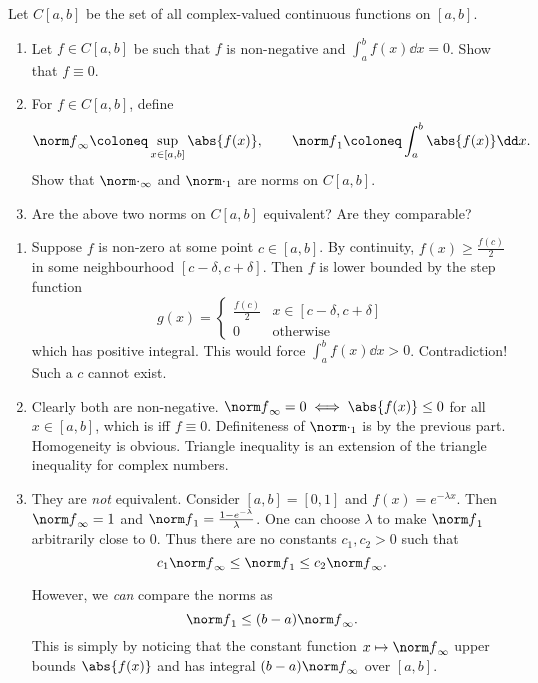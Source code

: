 \documentclass[12pt]{article}
\begin{document}
\begin{problem}
    Let $C[a, b]$ be the set of all complex-valued continuous functions
    on $[a, b]$.
    \begin{enumerate}
        \item Let $f \in C[a, b]$ be such that $f$ is non-negative and
            $\int_a^b f(x) \dd x = 0$.
            Show that $f \equiv 0$.
        \item For $f \in C[a, b]$, define \[
            {\norm f}_\infty \coloneq \sup_{x \in [a, b]} \abs{f(x)},
            \qquad
            {\norm f}_1 \coloneq \int_a^b \abs{f(x)} \dd x.
        \] Show that ${\norm \cdot}_\infty$ and ${\norm \cdot}_1$ are norms
        on $C[a, b]$.
        \item Are the above two norms on $C[a, b]$ equivalent?
        Are they comparable?
    \end{enumerate}
\end{problem}
\begin{solution} \leavevmode
    \begin{enumerate}
        \item Suppose $f$ is non-zero at some point $c \in [a, b]$.
            By continuity, $f(x) \ge \frac{f(c)}{2}$ in some neighbourhood
            $[c - \delta, c + \delta]$.
            Then $f$ is lower bounded by the step function \[
                g(x) = \begin{cases}
                    \frac{f(c)}{2} & x \in [c - \delta, c + \delta] \\
                    0 & \text{otherwise}
                \end{cases}
            \] which has positive integral.
            This would force $\int_a^b f(x) \dd x > 0$.
            Contradiction! Such a $c$ cannot exist.
        \item Clearly both are non-negative.
            ${\norm f}_\infty = 0 \iff \abs{f(x)} \le 0$ for all
            $x \in [a, b]$, which is iff $f \equiv 0$.
            Definiteness of ${\norm\cdot}_1$ is by the previous part.
            Homogeneity is obvious.
            Triangle inequality is an extension of the triangle inequality
            for complex numbers.
        \item They are \emph{not} equivalent.
            Consider $[a, b] = [0, 1]$ and $f(x) = e^{-\lambda x}$.
            Then ${\norm f}_\infty = 1$ and
            ${\norm f}_1 = \frac{1 - e^{-\lambda}}{\lambda}$.
            One can choose $\lambda$ to make ${\norm f}_1$ arbitrarily
            close to $0$.
            Thus there are no constants $c_1, c_2 > 0$ such that \[
                c_1 {\norm f}_\infty
                  \le {\norm f}_1
                    \le c_2 {\norm f}_\infty.
            \]

            However, we \emph{can} compare the norms as \[
                {\norm f}_1 \le (b - a) {\norm f}_\infty.
            \] This is simply by noticing that the constant function
            $x \mapsto {\norm f}_\infty$ upper bounds $\abs{f(x)}$ and has
            integral $(b - a) {\norm f}_\infty$ over $[a, b]$. \qedhere
    \end{enumerate}
\end{solution}
\end{document}
